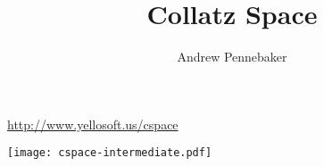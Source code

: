 \documentclass[b1,portrait]{sciposter}
\title{Collatz Space}
\author{Andrew Pennebaker}
\begin{document}
\maketitle

\begin{center}
\url{http://www.yellosoft.us/cspace}
\end{center}

\vspace*{\fill}
\begin{center}
\texttt{[image: cspace-intermediate.pdf]}
\end{center}
\vspace*{\fill}
\end{document}
